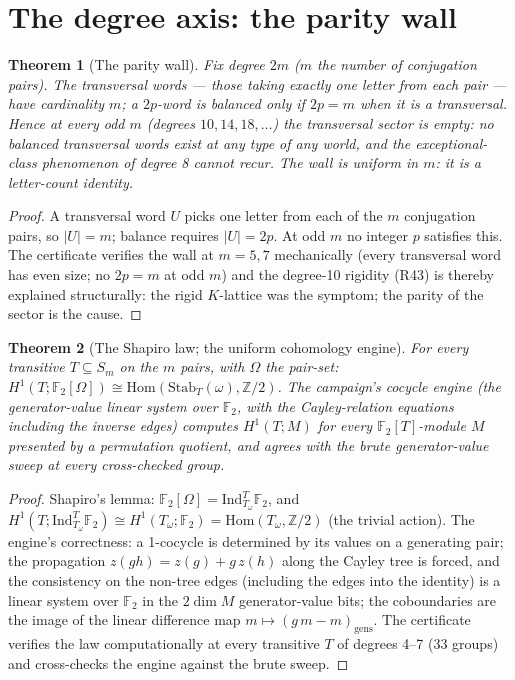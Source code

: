 \documentclass[11pt]{article}
\newtheorem{theorem}{Theorem}
\begin{document}
\section{The degree axis: the parity wall}

\begin{theorem}[The parity wall]\label{thm:parity-wall}
Fix degree $2m$ ($m$ the number of conjugation pairs).  The \emph{transversal} words --- those
taking exactly one letter from each pair --- have cardinality $m$; a $2p$-word is balanced only
if $2p = m$ when it is a transversal.  Hence at every \emph{odd} $m$ (degrees $10, 14, 18,
\dots$) the transversal sector is empty: no balanced transversal words exist at any type of any
world, and the exceptional-class phenomenon of degree 8 cannot recur.  The wall is uniform in
$m$: it is a letter-count identity.
\end{theorem}

\begin{proof}
A transversal word $U$ picks one letter from each of the $m$ conjugation pairs, so $|U| = m$;
balance requires $|U| = 2p$.  At odd $m$ no integer $p$ satisfies this.  The certificate
verifies the wall at $m = 5, 7$ mechanically (every transversal word has even size; no $2p = m$
at odd $m$) and the degree-10 rigidity (R43) is thereby explained structurally: the rigid
$K$-lattice was the symptom; the parity of the sector is the cause.
\end{proof}

\begin{theorem}[The Shapiro law; the uniform cohomology engine]\label{thm:shapiro}
For every transitive $T \subseteq S_m$ on the $m$ pairs, with $\Omega$ the pair-set:
$H^1(T; \mathbb{F}_2[\Omega]) \cong \mathrm{Hom}(\mathrm{Stab}_T(\omega), \mathbb{Z}/2)$.
The campaign's cocycle engine (the generator-value linear system over $\mathbb{F}_2$, with the
Cayley-relation equations including the inverse edges) computes $H^1(T; M)$ for every
$\mathbb{F}_2[T]$-module $M$ presented by a permutation quotient, and agrees with the
brute generator-value sweep at every cross-checked group.
\end{theorem}

\begin{proof}
Shapiro's lemma: $\mathbb{F}_2[\Omega] = \mathrm{Ind}_{T_\omega}^T \mathbb{F}_2$, and
$H^1(T; \mathrm{Ind}_{T_\omega}^T \mathbb{F}_2) \cong H^1(T_\omega; \mathbb{F}_2) =
\mathrm{Hom}(T_\omega, \mathbb{Z}/2)$ (the trivial action).  The engine's correctness: a
1-cocycle is determined by its values on a generating pair; the propagation
$z(gh) = z(g) + g\,z(h)$ along the Cayley tree is forced, and the consistency on the non-tree
edges (including the edges into the identity) is a linear system over $\mathbb{F}_2$ in the
$2\dim M$ generator-value bits; the coboundaries are the image of the linear difference map
$m \mapsto (g\,m - m)_\text{gens}$.  The certificate verifies the law computationally at every
transitive $T$ of degrees 4--7 (33 groups) and cross-checks the engine against the brute sweep.
\end{proof}
\end{document}
